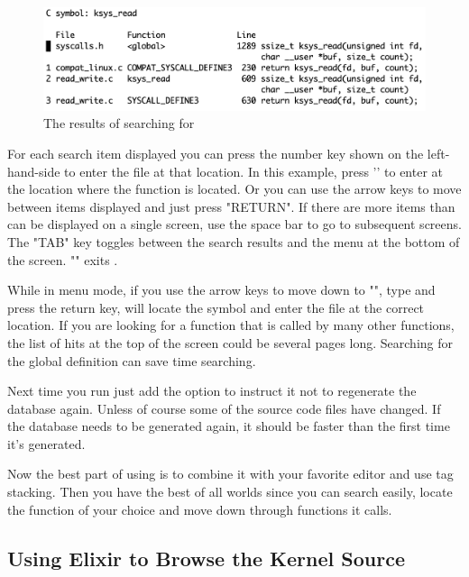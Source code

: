 \begin{figure}
	\centering
	\includegraphics[scale=0.6]{figures/cscope-2.png}
	\caption{The  results of searching for }
	\label{fig:cscope-2}
\end{figure}

For each search item displayed you can press the number key shown on the left-hand-side to enter the file at that location. In this example, press '' to enter  at the location where the function  is located. Or you can use the arrow keys to move between items displayed and just press "RETURN". If there are more items than can be displayed on a single screen, use the space bar to go to subsequent screens. The "TAB" key toggles between the search results and the menu at the bottom of the screen. "" exits . 

While in menu mode, if you use the arrow keys to move down to "", type  and press the return key,  will locate the symbol and enter the file at the correct location. If you are looking for a function that is called by many other functions, the list of hits at the top of the screen could be several pages long. Searching for the global definition can save time searching.

Next time you run  just add the  option to instruct it not to regenerate the database again. Unless of course some of the source code files have changed. If the database needs to be generated again, it should be faster than the first time it's generated.

Now the best part of using  is to combine it with your favorite editor and use tag stacking. Then you have the best of all worlds since you can search easily, locate the function of your choice and move down through functions it calls.


\subsection{Using Elixir to Browse the Kernel Source}


